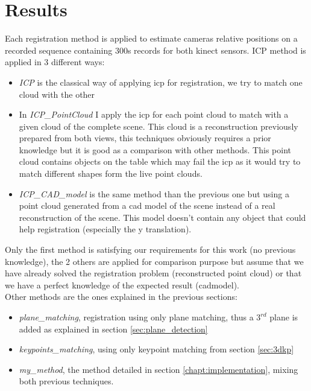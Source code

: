 
\chapter{Results}

Each registration method is applied to estimate cameras relative positions on a recorded sequence containing 300s records for both kinect sensors. ICP method is applied in 3 different ways:

\begin{itemize}
    \item \emph{ICP} is the classical way of applying \acrshort{icp} for registration, we try to match one cloud with the other
    \item In \emph{ICP\_PointCloud} I apply the \acrshort{icp} for each point cloud to match with a given cloud of the complete scene. This cloud is a reconstruction previously prepared from both views, this techniques obviously requires a prior knowledge but it is good as a comparison with other methods. This point cloud contains objects on the table which may fail the \acrshort{icp} as it would try to match different shapes form the live point clouds.
    \item \emph{ICP\_CAD\_model} is the same method than the previous one but using a point cloud generated from a \acrshort{cad} model of the scene instead of a real reconstruction of the scene. This model doesn't contain any object that could help registration (especially the y translation).
\end{itemize}
Only the first method is satisfying our requirements for this work (no previous knowledge), the 2 others are applied for comparison purpose but assume that we have already solved the registration problem (reconstructed point cloud) or that we have a perfect knowledge of the expected result (\acrshort{cad}model). \\
Other methods are the ones explained in the previous sections:
\begin{itemize}
    \item \emph{plane\_matching}, registration using only plane matching, thus a $3^{rd}$ plane is added as explained in section \ref{sec:plane_detection}
    \item \emph{keypoints\_matching}, using only keypoint matching from section \ref{sec:3dkp}
    \item \emph{my\_method}, the method detailed in section \ref{chapt:implementation}, mixing both previous techniques.
\end{itemize}

